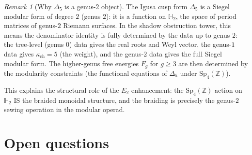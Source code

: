 \documentclass[11pt]{amsart}
\theoremstyle{definition}
\theoremstyle{remark}
\newtheorem{remark}[theorem]{Remark}
\begin{document}
\begin{remark}[Why $\Delta_5$ is a genus-$2$ object]
The Igusa cusp form $\Delta_5$ is a Siegel modular form of
degree $2$ (genus $2$): it is a function on $\mathbb{H}_2$,
the space of period matrices of genus-$2$ Riemann surfaces.
In the shadow obstruction tower, this means the denominator identity is
fully determined by the data up to genus $2$: the tree-level
(genus $0$) data gives the real roots and Weyl vector, the
genus-$1$ data gives $\kappa_{\mathrm{ch}} = 5$ (the weight), and the
genus-$2$ data gives the full Siegel modular form. The
higher-genus free energies $F_g$ for $g \geq 3$ are then
determined by the modularity constraints (the functional
equations of $\Delta_5$ under $\mathrm{Sp}_4(\mathbb{Z})$).

This explains the structural role of the $E_2$-enhancement:
the $\mathrm{Sp}_4(\mathbb{Z})$ action on $\mathbb{H}_2$ IS
the braided monoidal structure, and the braiding is precisely
the genus-$2$ sewing operation in the modular operad.
\end{remark}

\section{Open questions}\label{sec:open}
\end{document}
